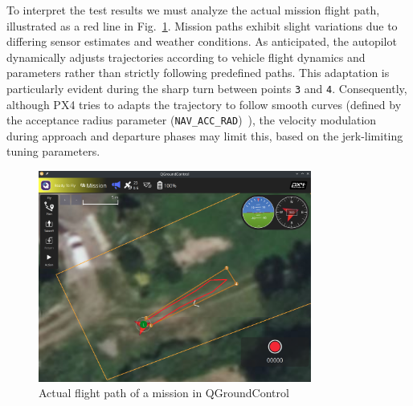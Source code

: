 To interpret the test results we must analyze the actual mission flight path,
illustrated as a red line in Fig.~\ref{fig:mission-final-actual}.
Mission paths exhibit slight variations due to differing sensor estimates and
weather conditions.
%
As anticipated, the autopilot dynamically adjusts trajectories according to
vehicle flight dynamics and parameters rather than strictly following predefined
paths. This adaptation is particularly evident during the sharp turn between
points \lstinline{3} and \lstinline{4}.
%
Consequently, although PX4 tries to adapts the trajectory to follow smooth
curves (defined by the acceptance radius parameter
(\lstinline{NAV_ACC_RAD})~\cite{px4MissionModePath}), the velocity modulation
during approach and departure phases may limit this, based on the jerk-limiting tuning parameters.

\begin{figure}[!hbt]
  \centering
  \includegraphics[width=0.8\textwidth]{./img/png/mission-final-actual} 
  \caption{Actual flight path of a mission in QGroundControl}%
  \label{fig:mission-final-actual}
\end{figure}

